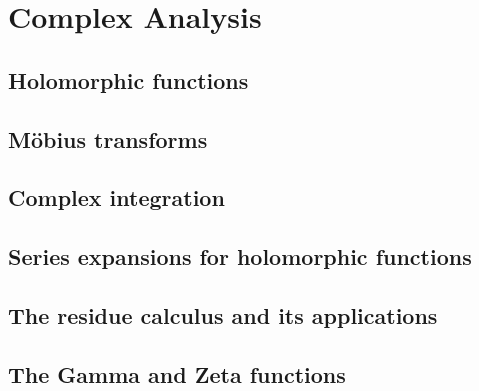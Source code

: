 \chapter{Complex Analysis}\label{cha:complex-analysis}

\section{Holomorphic functions}

\section{M\"obius transforms}

\section{Complex integration}

\section{Series expansions for holomorphic functions}

\section{The residue calculus and its applications}

\section{The Gamma and Zeta functions}

